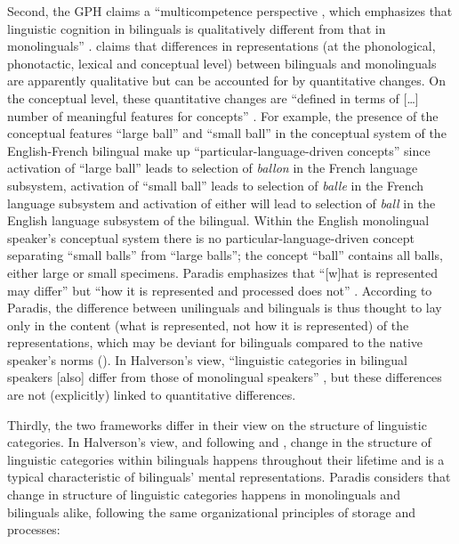 Second, the GPH claims a “multicompetence perspective \citep{cook_effects_2003}, which emphasizes that linguistic cognition in bilinguals is qualitatively different from that in monolinguals” \citep[12]{de_sutter_developing_2017}. \citet[22]{kecskes_neurofunctional_2007} claims that differences in representations (at the phonological, phonotactic, lexical and conceptual level) between bilinguals and monolinguals are apparently qualitative but can be accounted for by quantitative changes. On the conceptual level, these quantitative changes are “defined in terms of […] number of meaningful features for concepts” \citep[22]{kecskes_neurofunctional_2007}. For example, the presence of the conceptual features “large ball” and “small ball” in the conceptual system of the English-French bilingual make up “particular-language-driven concepts” \citep[23]{kecskes_neurofunctional_2007} since activation of “large ball” leads to selection of \textit{ballon} in the French language subsystem, activation of “small ball” leads to selection of \textit{balle} in the French language subsystem and activation of either will lead to selection of \textit{ball} in the English language subsystem of the bilingual. Within the English monolingual speaker’s conceptual system there is no particular-language-driven concept separating “small balls” from “large balls”; the concept “ball” contains all balls, either large or small specimens. Paradis emphasizes that “[w]hat is represented may differ” but “how it is represented and processed does not” \citep[22]{kecskes_neurofunctional_2007}. According to Paradis, the difference between unilinguals and bilinguals is thus thought to lay only in the content (what is represented, not how it is represented) of the representations, which may be deviant for bilinguals compared to the native speaker’s norms (\citeyear[11]{kecskes_neurofunctional_2007}). In Halverson’s view, “linguistic categories in bilingual speakers [also] differ from those of monolingual speakers” \citep[12]{de_sutter_developing_2017}, but these differences are not (explicitly) linked to quantitative differences. 

Thirdly, the two frameworks differ in their view on the structure of linguistic categories. In Halverson’s view, and following \citet{cook_effects_2003} and \citet{cook_second_2011}, change in the structure of linguistic categories within bilinguals happens throughout their lifetime and is a typical characteristic of bilinguals’ mental representations. Paradis considers that change in structure of linguistic categories happens in monolinguals and bilinguals alike, following the same organizational principles of storage and processes:

